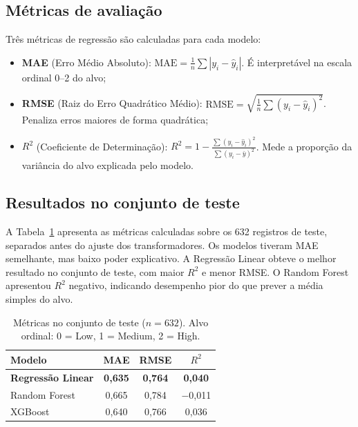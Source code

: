 \documentclass[conference]{IEEEtran}
\newcommand{\fonte}[1][elaborado pelos autores.]{%
\par\vspace{1pt}{\footnotesize\centering Fonte: #1\par}}
\begin{document}
\subsection{Métricas de avaliação}

Três métricas de regressão são calculadas para cada modelo:

\begin{itemize}
\item \textbf{MAE} (Erro Médio Absoluto):
$\text{MAE} = \frac{1}{n}\sum|y_i - \hat{y}_i|$.
É interpretável na escala ordinal 0--2 do alvo;
\item \textbf{RMSE} (Raiz do Erro Quadrático Médio):
$\text{RMSE} = \sqrt{\frac{1}{n}\sum(y_i-\hat{y}_i)^2}$.
Penaliza erros maiores de forma quadrática;
\item \textbf{$R^2$} (Coeficiente de Determinação):
$R^2 = 1 - \frac{\sum(y_i-\hat{y}_i)^2}{\sum(y_i-\bar{y})^2}$.
Mede a proporção da variância do alvo explicada pelo modelo.
\end{itemize}

\subsection{Resultados no conjunto de teste}

A Tabela~\ref{tab:test} apresenta as métricas calculadas sobre os 632
registros de teste, separados antes do ajuste dos transformadores. Os
modelos tiveram MAE semelhante, mas baixo poder explicativo. A Regressão
Linear obteve o melhor resultado no conjunto de teste, com maior $R^2$ e menor
RMSE. O Random Forest apresentou $R^2$ negativo, indicando desempenho pior do
que prever a média simples do alvo.

\begin{table}[H]
\centering
\small
\setlength{\tabcolsep}{4pt}
\caption{Métricas no conjunto de teste ($n = 632$). Alvo ordinal: 0 = Low, 1 = Medium, 2 = High.}
\label{tab:test}
\begin{tabular}{lccc}
\toprule
\textbf{Modelo}           & \textbf{MAE}   & \textbf{RMSE}  & \textbf{$R^2$} \\
\midrule
\textbf{Regressão Linear} & \textbf{0,635} & \textbf{0,764} & \textbf{0,040} \\
Random Forest             & 0,665          & 0,784          & $-$0,011       \\
XGBoost                   & 0,640          & 0,766          & 0,036          \\
\bottomrule
\end{tabular}
\fonte
\end{table}
\end{document}
